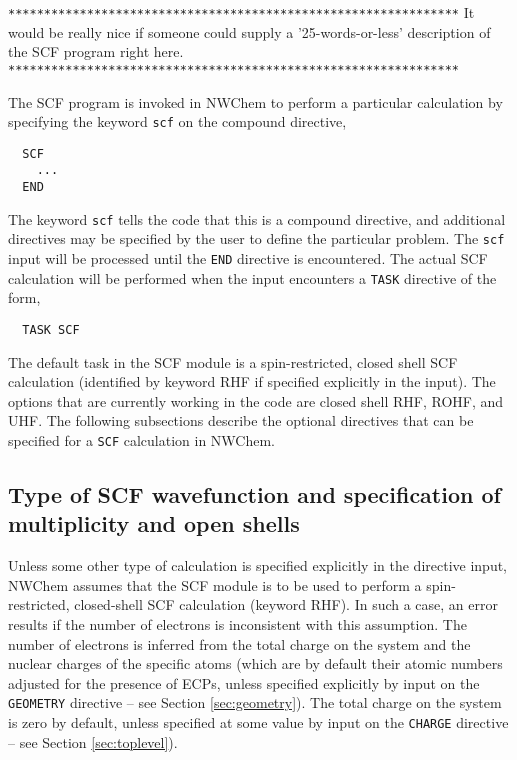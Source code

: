 \label{SCF}
\Large
\verb+***************************************************************+
It would be really nice if someone could supply a '25-words-or-less'
description of the SCF program right here.
\verb+***************************************************************+
\normalsize

The SCF program is invoked in NWChem to perform a particular calculation 
by specifying the keyword \verb+scf+ on the compound directive,

\begin{verbatim}
  SCF
    ...
  END
\end{verbatim}

The keyword \verb+scf+ tells the code that this is a compound directive,
and additional directives may be specified by the user to define the particular
problem.  The \verb+scf+ input will be processed until the
\verb+END+ directive is encountered.  The actual SCF calculation will
be performed when the input encounters a \verb+TASK+ directive of the form,

\begin{verbatim}
  TASK SCF
\end{verbatim}

The default task in the SCF module is a spin-restricted, 
closed shell SCF calculation (identified by keyword RHF if specified 
explicitly in the input).  The options that are currently working
in the code are closed shell RHF, ROHF, and UHF. The following 
subsections describe the
optional directives that can be specified for a \verb+SCF+ calculation
in NWChem.


\subsection{Type of SCF wavefunction and specification of multiplicity
and open shells}

Unless some other type of calculation is specified explicitly in
the directive input, NWChem assumes that the SCF module is to be used
to perform a spin-restricted,
closed-shell SCF calculation (keyword RHF).  In such a case, an error results
if the number of electrons is inconsistent with this assumption.
The number of electrons is inferred from the
total charge on the system and the nuclear charges of the
specific atoms (which are by default their atomic numbers
adjusted for the presence of ECPs, unless specified
explicitly by input on the \verb+GEOMETRY+ directive -- see Section 
\ref{sec:geometry}).  The total charge on the system is zero by default, 
unless specified at
some value by input on the \verb+CHARGE+ directive -- see Section 
\ref{sec:toplevel}).

